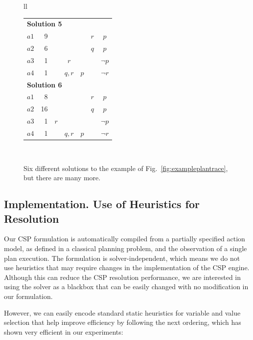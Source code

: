 \documentclass[runningheads]{llncs}
\begin{document}
\begin{figure}
\begin{tabular}{ll}
\begin{tabular}{cr|ccccc}
\hline

\multicolumn{7}{l}{\bf Solution 5} \\
$a1$ & 9 & & & & $r$ & $p$ \\
$a2$ & 6 & & & & $q$ & $p$ \\
$a3$ & 1 & & $r$ & & & $\neg p$ \\
$a4$ & 1 & & $q,r$ & $p$ & & $\neg r$ \\

\hline

\multicolumn{7}{l}{\bf Solution 6} \\
$a1$ & 8 & & & & $r$ & $p$ \\
$a2$ & 16 & & & & $q$ & $p$ \\
$a3$ & 1 & $r$ & & & & $\neg p$ \\
$a4$ & 1 & & $q,r$ & $p$ & & $\neg r$ \\

\end{tabular} \\

\end{tabular}
\normalsize

\caption{Six different solutions to the example of Fig.~\ref{fig:exampleplantrace}, but there are many more.}
\label{figure:solutionsExample}
\end{figure}


\subsection{Implementation. Use of Heuristics for Resolution}
\label{sec:implementation}

Our CSP formulation is automatically compiled from a partially specified action model, as defined in a classical planning problem, and the observation of a single plan execution. The formulation is solver-independent, which means we do not use heuristics that may require changes in the implementation of the CSP engine. Although this can reduce the CSP resolution performance, we are interested in using the solver as a blackbox that can be easily changed with no modification in our formulation.

However, we can easily encode standard static heuristics for variable and value selection that help improve efficiency by following the next ordering, which has shown very efficient in our experiments:

\end{document}
